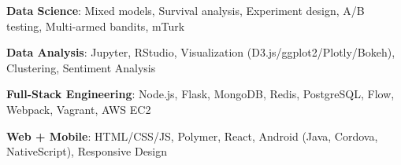 \documentclass[margin,line]{resume}
\begin{document}
\begin{resume}
\vspace{-4mm}

\textbf{Data Science}: Mixed models, Survival analysis, Experiment design, A/B testing, Multi-armed bandits, mTurk %

\vspace{-4mm}

\textbf{Data Analysis}: Jupyter, RStudio, Visualization (D3.js/ggplot2/Plotly/Bokeh), Clustering, Sentiment Analysis %



\vspace{-4mm}


\textbf{Full-Stack Engineering}: Node.js, Flask, MongoDB, Redis, PostgreSQL, Flow, Webpack, Vagrant, AWS EC2 %








\vspace{-4mm}

\textbf{Web + Mobile}: HTML/CSS/JS, Polymer, React, Android (Java, Cordova, NativeScript), Responsive Design


\end{resume}
\end{document}
